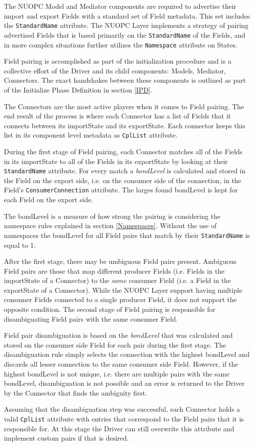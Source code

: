 %

\label{FieldPairing}

The NUOPC Model and Mediator components are required to advertise their import and export Fields with a standard set of Field metadata. This set includes the {\tt StandardName} attribute. The NUOPC Layer implements a strategy of pairing advertised Fields that is based primarily on the {\tt StandardName} of the Fields, and in more complex situations further utilizes the {\tt Namespace} attribute on States.

Field pairing is accomplished as part of the initialization procedure and is a collective effort of the Driver and its child components: Models, Mediator, Connectors. The exact handshakes between these components is outlined as part of the Initialize Phase Definition in section \ref{IPD}.

The Connectors are the most active players when it comes to Field pairing. The end result of the process is where each Connector has a list of Fields that it connects between its importState and its exportState. Each connector keeps this list in its component level metadata as {\tt CplList} attribute.

During the first stage of Field pairing, each Connector matches all of the Fields in its importState to all of the Fields in its exportState by looking at their {\tt StandardName} attribute. For every match a {\em bondLevel} is calculated and stored in the Field on the export side, i.e. on the consumer side of the connection, in the Field's {\tt ConsumerConnection} attribute. The larges found bondLevel is kept for each Field on the export side.

The bondLevel is a measure of how strong the pairing is considering the namespace rules explained in section \ref{Namespaces}. Without the use of namespaces the bondLevel for all Field pairs that match by their {\tt StandardName} is equal to 1.

After the first stage, there may be umbiguous Field pairs present. Ambiguous Field pairs are those that map different producer Fields (i.e. Fields in the importState of a Connector) to the {\em same} consumer Field (i.e. a Field in the exportState of a Connector). While the NUOPC Layer support having multiple consumer Fields connected to a single producer Field, it does not support the opposite condition. The second stage of Field pairing is responsible for disambiguating Field pairs with the same consumer Field.

Field pair disambiguation is based on the {\em bondLevel} that was calculated and stored on the consumer side Field for each pair during the first stage. The disambiguation rule simply selects the connection with the highest bondLevel and discards all lesser connection to the same consumer side Field. However, if the highest bondLevel is not unique, i.e. there are multiple pairs with the same bondLevel, disambiguation is not possible and an error is returned to the Driver by the Connector that finds the ambiguity first.

Assuming that the disambiguation step was successful, each Connector holds a valid {\tt CplList} attribute with entries that correspond to the Field pairs that it is responsible for. At this stage the Driver can still overwrite this attribute and implement custom pairs if that is desired.

